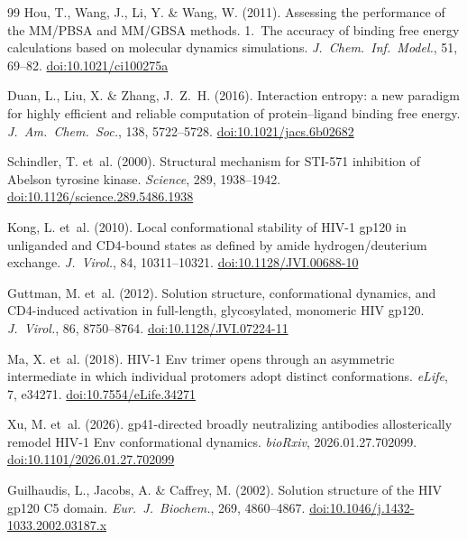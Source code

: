 \documentclass[11pt,a4paper]{article}
\begin{document}
\begin{thebibliography}{99}
Hou, T., Wang, J., Li, Y. \& Wang, W. (2011).
\newblock Assessing the performance of the MM/PBSA and MM/GBSA methods. 1.\ The accuracy of binding free energy calculations based on molecular dynamics simulations.
\newblock \textit{J.\ Chem.\ Inf.\ Model.}, 51, 69--82.
\newblock \href{https://doi.org/10.1021/ci100275a}{doi:10.1021/ci100275a}

Duan, L., Liu, X. \& Zhang, J.~Z.~H. (2016).
\newblock Interaction entropy: a new paradigm for highly efficient and reliable computation of protein--ligand binding free energy.
\newblock \textit{J.\ Am.\ Chem.\ Soc.}, 138, 5722--5728.
\newblock \href{https://doi.org/10.1021/jacs.6b02682}{doi:10.1021/jacs.6b02682}

Schindler, T. et~al. (2000).
\newblock Structural mechanism for STI-571 inhibition of Abelson tyrosine kinase.
\newblock \textit{Science}, 289, 1938--1942.
\newblock \href{https://doi.org/10.1126/science.289.5486.1938}{doi:10.1126/science.289.5486.1938}

Kong, L. et~al. (2010).
\newblock Local conformational stability of HIV-1 gp120 in unliganded and CD4-bound states as defined by amide hydrogen/deuterium exchange.
\newblock \textit{J.\ Virol.}, 84, 10311--10321.
\newblock \href{https://doi.org/10.1128/JVI.00688-10}{doi:10.1128/JVI.00688-10}

Guttman, M. et~al. (2012).
\newblock Solution structure, conformational dynamics, and CD4-induced activation in full-length, glycosylated, monomeric HIV gp120.
\newblock \textit{J.\ Virol.}, 86, 8750--8764.
\newblock \href{https://doi.org/10.1128/JVI.07224-11}{doi:10.1128/JVI.07224-11}

Ma, X. et~al. (2018).
\newblock HIV-1 Env trimer opens through an asymmetric intermediate in which individual protomers adopt distinct conformations.
\newblock \textit{eLife}, 7, e34271.
\newblock \href{https://doi.org/10.7554/eLife.34271}{doi:10.7554/eLife.34271}

Xu, M. et~al. (2026).
\newblock gp41-directed broadly neutralizing antibodies allosterically remodel HIV-1 Env conformational dynamics.
\newblock \textit{bioRxiv}, 2026.01.27.702099.
\newblock \href{https://doi.org/10.1101/2026.01.27.702099}{doi:10.1101/2026.01.27.702099}

Guilhaudis, L., Jacobs, A. \& Caffrey, M. (2002).
\newblock Solution structure of the HIV gp120 C5 domain.
\newblock \textit{Eur.\ J.\ Biochem.}, 269, 4860--4867.
\newblock \href{https://doi.org/10.1046/j.1432-1033.2002.03187.x}{doi:10.1046/j.1432-1033.2002.03187.x}


\end{thebibliography}
\end{document}
